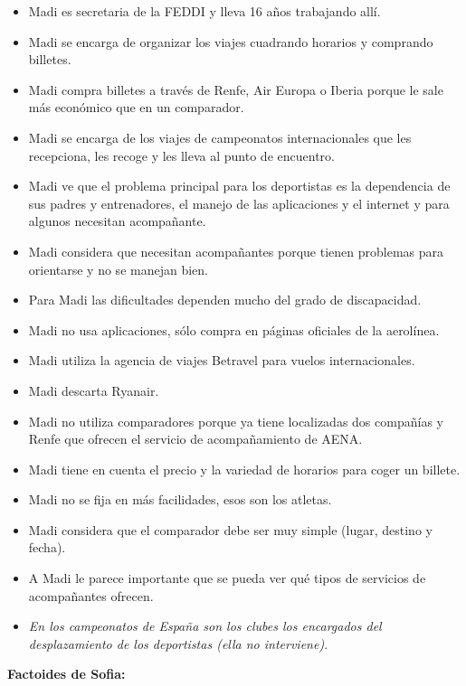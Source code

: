 \begin{itemize}
    \item Madi es secretaria de la FEDDI y lleva 16 años trabajando allí.
    \item Madi se encarga de organizar los viajes cuadrando horarios y comprando billetes.
    \item Madi compra billetes a través de Renfe, Air Europa o Iberia porque le sale más económico que en un comparador.
    \item Madi se encarga de los viajes de campeonatos internacionales que les recepciona, les recoge y les lleva al punto de encuentro.
    \item Madi ve que el problema principal para los deportistas es la dependencia de sus padres y entrenadores, el manejo de las aplicaciones y el internet y para algunos necesitan acompañante.
    \item Madi considera que necesitan acompañantes porque tienen problemas para orientarse y no se manejan bien.
    \item Para Madi las dificultades dependen mucho del grado de discapacidad.
    \item Madi no usa aplicaciones, sólo compra en páginas oficiales de la aerolínea.
    \item Madi utiliza la agencia de viajes Betravel para vuelos internacionales.
    \item Madi descarta Ryanair.
    \item Madi no utiliza comparadores porque ya tiene localizadas dos compañías y Renfe que ofrecen el servicio de acompañamiento de AENA.
    \item Madi tiene en cuenta el precio y la variedad de horarios para coger un billete.
    \item Madi no se fija en más facilidades, esos son los atletas.
    \item Madi considera que el comparador debe ser muy simple (lugar, destino y fecha).
    \item A Madi le parece importante que se pueda ver qué tipos de servicios de acompañantes ofrecen.
    \item \textit{En los campeonatos de España son los clubes los encargados del desplazamiento de los deportistas (ella no interviene)}.
\end{itemize}


\textbf{Factoides de Sofia:}

